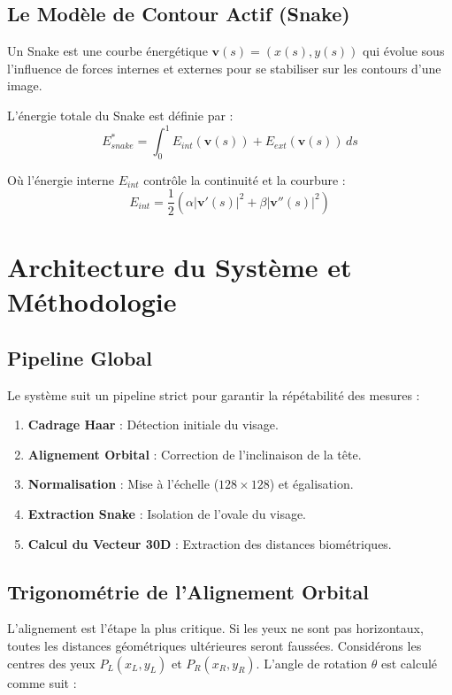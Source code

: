 \documentclass[11pt,a4paper,oneside]{report}
\begin{document}
\section{Le Modèle de Contour Actif (Snake)}
\begin{tcolorbox}[defbox={Le Modèle Snake}]
Un Snake est une courbe énergétique $\mathbf{v}(s) = (x(s), y(s))$ qui évolue sous l'influence de forces internes et externes pour se stabiliser sur les contours d'une image.
\end{tcolorbox}

L'énergie totale du Snake est définie par :
\begin{equation}
    E_{snake}^* = \int_{0}^{1} E_{int}(\mathbf{v}(s)) + E_{ext}(\mathbf{v}(s)) \, ds
\end{equation}

Où l'énergie interne $E_{int}$ contrôle la continuité et la courbure :
\begin{equation}
    E_{int} = \frac{1}{2} (\alpha |\mathbf{v}'(s)|^2 + \beta |\mathbf{v}''(s)|^2)
\end{equation}

\chapter{Architecture du Système et Méthodologie}

\section{Pipeline Global}
Le système suit un pipeline strict pour garantir la répétabilité des mesures :
\begin{enumerate}
    \item \textbf{Cadrage Haar} : Détection initiale du visage.
    \item \textbf{Alignement Orbital} : Correction de l'inclinaison de la tête.
    \item \textbf{Normalisation} : Mise à l'échelle ($128 \times 128$) et égalisation.
    \item \textbf{Extraction Snake} : Isolation de l'ovale du visage.
    \item \textbf{Calcul du Vecteur 30D} : Extraction des distances biométriques.
\end{enumerate}

\section{Trigonométrie de l'Alignement Orbital}
L'alignement est l'étape la plus critique. Si les yeux ne sont pas horizontaux, toutes les distances géométriques ultérieures seront faussées.
Considérons les centres des yeux $P_L(x_L, y_L)$ et $P_R(x_R, y_R)$. L'angle de rotation $\theta$ est calculé comme suit :
\end{document}
